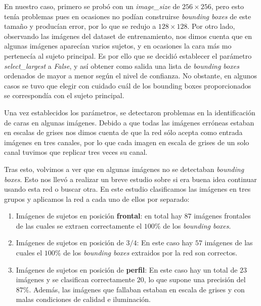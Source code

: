             \noindent En nuestro caso, primero se probó con un \textit{image\_size} de $256 \times 256$, pero esto tenía problemas pues en ocasiones no podían construirse \textit{bounding boxes} de este tamaño y producían error, por lo que se redujo a $128 \times 128$. Por otro lado, observando las imágenes del dataset de entrenamiento, nos dimos cuenta que en algunas imágenes aparecían varios sujetos, y en ocasiones la cara más  mo pertenecía al sujeto principal. Es por ello que se decidió establecer el parámetro \textit{select\_largest} a \textit{False}, y así obtener como salida una lista de \textit{bounding boxes} ordenados de mayor a menor según el nivel de confianza. No obstante, en algunos casos se tuvo que elegir con cuidado cuál de los bounding boxes proporcionados se correspondía con el sujeto principal.

            \medskip

            \noindent Una vez establecidos los parámetros, se detectaron problemas en la identificación de caras en algunas imágenes. Debido a que todas las imágenes erróneas estaban en escalas de grises nos dimos cuenta de que la red sólo acepta como entrada imágenes en tres canales, por lo que cada imagen en escala de grises de un solo canal tuvimos que replicar tres veces su canal. 
        
            \medskip
        
            \noindent Tras esto, volvimos a ver que en algunas imágenes no se detectaban \textit{bounding boxes}. Esto nos llevó a realizar un breve estudio sobre si era buena idea continuar usando esta red o buscar otra. En este estudio clasificamos las imágenes en tres grupos y aplicamos la red a cada uno de ellos por separado: 

            \begin{enumerate}
                \item Imágenes de sujetos en posición \textbf{ frontal}: en total hay $87$ imágenes frontales de las cuales se extraen correctamente el \textbf{$100\%$} de los \textit{bounding boxes}.
                \item Imágenes de sujetos en posición de \textbf{$3/4$}: En este caso hay $57$ imágenes de las cuales el \textbf{$100\%$} de los \textit{bounding boxes} extraidos por la red son correctos.
                \item Imágenes de sujetos en posición de \textbf{perfil}: En este caso hay un total de $23$ imágenes y se clasifican correctamente $20$, lo que supone una precisión del \textbf{$87\%$}. Además, las imágenes que fallaban estaban en escala de grises y con malas condiciones de calidad e iluminación.
            \end{enumerate}

